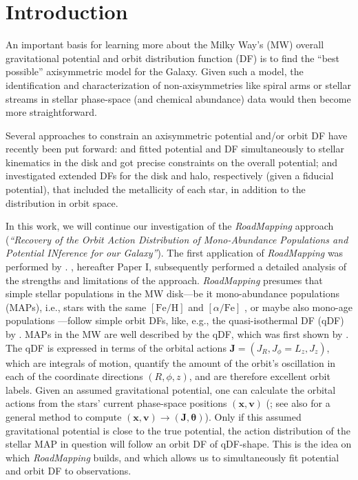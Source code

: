 \documentclass[iop,revtex4,numberedappendix,appendixfloats]{emulateapj}
\newcommand{\vect}[1]{\boldsymbol{#1}}
\newcommand{\RM}{{\sl RoadMapping}}
\begin{document}
\section{Introduction} \label{sec:intro}

An important basis for learning more about the Milky Way's (MW) overall gravitational potential and orbit distribution function (DF) is to find the ``best possible'' axisymmetric model for the Galaxy. Given such a model, the identification and characterization of non-axisymmetries like spiral arms or stellar streams in stellar phase-space (and chemical abundance) data would then become more straightforward.

Several approaches to constrain an axisymmetric potential and/or orbit DF have recently been put forward: \citet{2013ApJ...779..115B} and \citet{2014MNRAS.445.3133P} fitted potential and DF simultaneously to stellar kinematics in the disk and got precise constraints on the overall potential; \citet{2015MNRAS.449.3479S} and \citet{2016MNRAS.460.1725D} investigated extended DFs for the disk and halo, respectively (given a fiducial potential), that included the metallicity of each star, in addition to the distribution in orbit space.

In this work, we will continue our investigation of the \RM{} approach (\emph{``Recovery of the Orbit Action Distribution of Mono-Abundance Populations and Potential INference for our Galaxy''}). The first application of \RM{} was performed by \citet{2013ApJ...779..115B}. \citet{2016ApJ...830...97T}, hereafter Paper I, subsequently performed a detailed analysis of the strengths and limitations of the approach. \RM{} presumes that simple stellar populations in the MW disk---be it mono-abundance populations (MAPs), i.e., stars with the same $[\mathrm{Fe}/\mathrm{H}]$ and $[\alpha/\mathrm{Fe}]$ \citep{2012ApJ...751..131B,2012ApJ...753..148B,2012ApJ...755..115B,2016ApJ...823...30B}, or maybe also mono-age populations \citep{2013ApJ...773...43B,2014MNRAS.442.2474M,2016MNRAS.456.3655M,2014A&A...572A..92M,2017ApJ...834...27M,2016ApJ...823..114N}---follow simple orbit DFs, like, e.g., the quasi-isothermal DF (qDF) by \citet{2011MNRAS.413.1889B}. MAPs in the MW are well described by the qDF, which was first shown by \citet{2013MNRAS.434..652T}. The qDF is expressed in terms of the orbital actions $\vect{J}=(J_R,J_\phi=L_z,J_z)$, which are integrals of motion, quantify the amount of the orbit's oscillation in each of the coordinate directions $(R,\phi,z)$, and are therefore excellent orbit labels. Given an assumed gravitational potential, one can calculate the orbital actions from the stars' current phase-space positions $(\vect{x},\vect{v})$ (\citealt{2012MNRAS.426.1324B,2016MNRAS.457.2107S}; see also \citealt{2014ApJ...795...95B} for a general method to compute $(\vect{x},\vect{v})\longrightarrow(\vect{J},\vect{\theta})$). Only if this assumed gravitational potential is close to the true potential, the action distribution of the stellar MAP in question will follow an orbit DF of qDF-shape. This is the idea on which \RM{} builds, and which allows us to simultaneously fit potential and orbit DF to observations.
\end{document}
